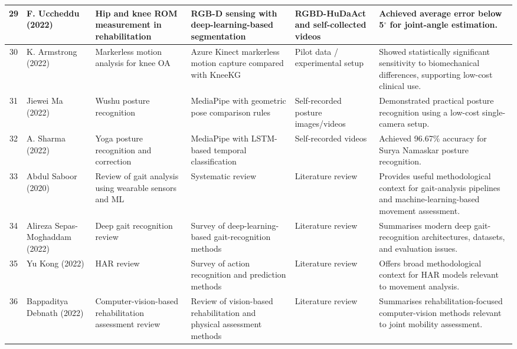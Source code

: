 \documentclass[12pt]{elsarticle}
\begin{document}
{\begin{longtable}{c p{2.7cm} p{2.8cm} p{3.3cm} p{3.4cm} p{3.6cm}}
29 & F. Uccheddu \cite{uccheddu2022rgb} (2022) & Hip and knee ROM measurement in rehabilitation & RGB-D sensing with deep-learning-based segmentation & RGBD-HuDaAct and self-collected videos & Achieved average error below 5$^\circ$ for joint-angle estimation. \\
\hline

30 & K. Armstrong \cite{armstrong2022novel} (2022) & Markerless motion analysis for knee OA & Azure Kinect markerless motion capture compared with KneeKG & Pilot data / experimental setup & Showed statistically significant sensitivity to biomechanical differences, supporting low-cost clinical use. \\
\hline

31 & Jiewei Ma \cite{ma2022wushu} (2022) & Wushu posture recognition & MediaPipe with geometric pose comparison rules & Self-recorded posture images/videos & Demonstrated practical posture recognition using a low-cost single-camera setup. \\
\hline

32 & A. Sharma \cite{sharma2022surya} (2022) & Yoga posture recognition and correction & MediaPipe with LSTM-based temporal classification & Self-recorded videos & Achieved 96.67\% accuracy for Surya Namaskar posture recognition. \\
\hline

33 & Abdul Saboor \cite{saboor2020latest} (2020) & Review of gait analysis using wearable sensors and ML & Systematic review & Literature review & Provides useful methodological context for gait-analysis pipelines and machine-learning-based movement assessment. \\
\hline

34 & Alireza Sepas-Moghaddam \cite{sepas2022deep} (2022) & Deep gait recognition review & Survey of deep-learning-based gait-recognition methods & Literature review & Summarises modern deep gait-recognition architectures, datasets, and evaluation issues. \\
\hline

35 & Yu Kong \cite{kong2022human} (2022) & HAR review & Survey of action recognition and prediction methods & Literature review & Offers broad methodological context for HAR models relevant to movement analysis. \\
\hline

36 & Bappaditya Debnath \cite{debnath2022review} (2022) & Computer-vision-based rehabilitation assessment review & Review of vision-based rehabilitation and physical assessment methods & Literature review & Summarises rehabilitation-focused computer-vision methods relevant to joint mobility assessment. \\
\hline


\end{longtable}}
\end{document}

